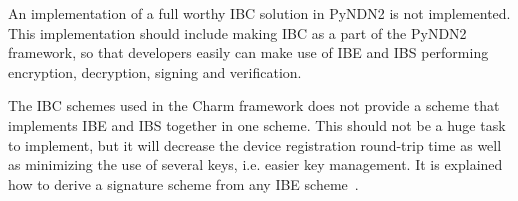 An implementation of a full worthy \gls{IBC} solution in \gls{PyNDN2} is not implemented.
This implementation should include making \gls{IBC} as a part of the PyNDN2 framework, so that developers easily can make use of \gls{IBE} and \gls{IBS} performing encryption, decryption, signing and verification.

The \gls{IBC} schemes used in the Charm framework does not provide a scheme that implements \gls{IBE} and \gls{IBS} together in one scheme.
This should not be a huge task to implement, but it will decrease the device registration round-trip time as well as minimizing the use of several keys, i.e. easier key management.
It is explained how to derive a signature scheme from any \gls{IBE} scheme~\cite[Section 4]{DBLP:conf/crypto/Waters09}.
